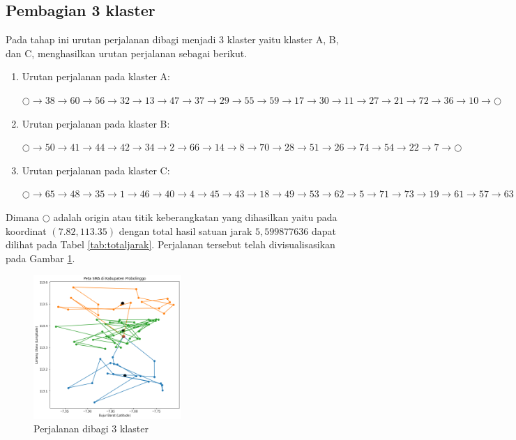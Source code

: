 \subsection{Pembagian 3 klaster}

Pada tahap ini urutan perjalanan dibagi menjadi 3 klaster yaitu klaster A, B, dan C, menghasilkan urutan perjalanan sebagai berikut.

\begin{enumerate}
\item Urutan perjalanan pada klaster A:

$\bigcirc \to 38 \to 60 \to 56 \to 32 \to 13 \to 47 \to 37 \to 29 \to 55 \to 59 \to 17 \to 30 \to 11 \to 27 \to 21 \to 72 \to 36 \to 10 \to \bigcirc$

\item Urutan perjalanan pada klaster B:

$\bigcirc \to 50 \to 41 \to 44 \to 42 \to 34 \to 2 \to 66 \to 14 \to 8 \to 70 \to 28 \to 51 \to 26 \to 74 \to 54 \to 22 \to 7 \to \bigcirc$

\item Urutan perjalanan pada klaster C:

$\bigcirc \to 65 \to 48 \to 35 \to 1 \to 46 \to 40 \to 4 \to 45 \to 43 \to 18 \to 49 \to 53 \to 62 \to 5 \to 71 \to 73 \to 19 \to 61 \to 57 \to 63 \to 15 \to 25 \to 68 \to 58 \to 24 \to 31 \to 16 \to 3 \to 12 \to 20 \to 52 \to 67 \to 69 \to 75 \to 39 \to 6 \to 64 \to 23 \to 33 \to 9 \to \bigcirc$

\end{enumerate}

Dimana $\bigcirc$ adalah origin atau titik keberangkatan yang dihasilkan yaitu pada koordinat $(7.82, 113.35)$ dengan total hasil satuan jarak $5,599877636$ dapat dilihat pada Tabel \ref{tab:totaljarak}. Perjalanan tersebut telah divisualisasikan pada Gambar \ref{fig:hasil_mtsp3}.

\begin{figure}[H]
\centering
\includegraphics[width=0.5\textwidth]{Gambar/hasil_mtsp/3}
\caption{Perjalanan dibagi 3 klaster}
\label{fig:hasil_mtsp3}
\end{figure}

